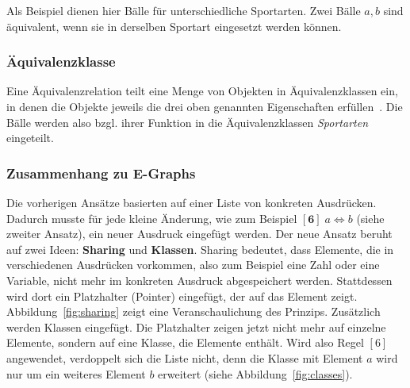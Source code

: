 Als Beispiel dienen hier Bälle für unterschiedliche Sportarten. Zwei Bälle $a, b$ sind äquivalent, wenn sie in derselben Sportart eingesetzt werden können. 

\subsubsection{Äquivalenzklasse}

Eine Äquivalenzrelation teilt eine Menge von Objekten in Äquivalenzklassen ein, in denen die Objekte jeweils die drei oben genannten Eigenschaften erfüllen~\cite{Ehrig2001}.
Die Bälle werden also bzgl. ihrer Funktion in die Äquivalenzklassen \textit{Sportarten} eingeteilt.

\subsubsection{Zusammenhang zu E-Graphs}

Die vorherigen Ansätze basierten auf einer Liste von konkreten Ausdrücken. Dadurch musste für jede kleine Änderung, wie zum Beispiel $[\mathbf{6}]\; a \Leftrightarrow b$ (siehe zweiter Ansatz),
ein neuer Ausdruck eingefügt werden. Der neue Ansatz beruht auf zwei Ideen: \textbf{Sharing} und \textbf{Klassen}.
Sharing bedeutet, dass Elemente, die in verschiedenen Ausdrücken vorkommen, also zum Beispiel eine Zahl oder eine Variable, nicht mehr im konkreten Ausdruck abgespeichert werden.
Stattdessen wird dort ein Platzhalter (Pointer) eingefügt, der auf das Element zeigt. Abbildung~\ref{fig:sharing} zeigt eine Veranschaulichung des Prinzips.
Zusätzlich werden Klassen eingefügt. Die Platzhalter zeigen jetzt nicht mehr auf einzelne Elemente, sondern auf eine Klasse, die Elemente enthält. Wird also Regel $[6]$ angewendet,
verdoppelt sich die Liste nicht, denn die Klasse mit Element $a$ wird nur um ein weiteres Element $b$ erweitert (siehe Abbildung~\ref{fig:classes}). 

